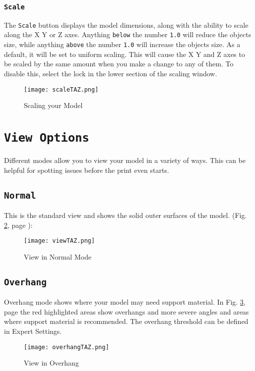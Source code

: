 \subsubsection{\texttt{Scale}}
The \texttt{Scale} button displays the model dimensions, along with the ability to scale along the X Y or Z axes. Anything \texttt{below} the number \texttt{1.0} will reduce the objects size, while anything \texttt{above} the number \texttt{1.0} will increase the objects size. As a default, it will be set to uniform scaling. This will cause the X Y and Z axes to be scaled by the same amount when you make a change to any of them. To disable this, select the lock in the lower section of the scaling window. 
\begin{figure}[H]
\centering
\texttt{[image: scaleTAZ.png]}
\caption{Scaling your Model}
\label{fig:Scaling your Model}
\end{figure}

\section{\texttt{View Options}}
Different modes allow you to view your model in a variety of ways. This can be helpful for spotting issues before the print even starts. 


\subsection{\texttt{Normal}}
This is the standard view and shows the solid outer surfaces of the model. (Fig. \ref{fig:Normal View}, page \pageref{fig:Normal View}): 

\begin{figure}[H]
\centering
\texttt{[image: viewTAZ.png]}
\caption{View in Normal Mode}
\label{fig:Normal View}
\end{figure}

\subsection{\texttt{Overhang}}
Overhang mode shows where your model may need support material. In Fig. \ref{fig:Overhang_View}, page \pageref{fig:Overhang_View} the red highlighted areas show overhangs and more severe angles and areas where support material is recommended. The overhang threshold can be defined in Expert Settings. 
\begin{figure}[H]
\centering
\texttt{[image: overhangTAZ.png]}
\caption{View in Overhang}
\label{fig:Overhang_View}
\end{figure}

